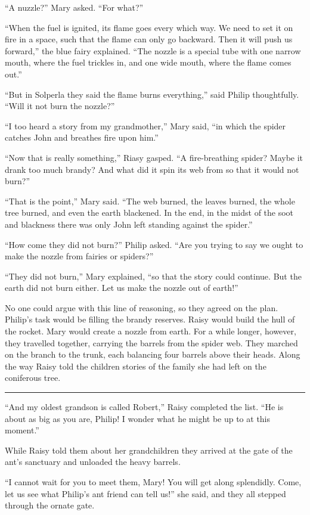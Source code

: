 \documentclass[10pt, draft]{memoir}
\renewcommand{\pfbreakdisplay}{\bigskip \ding{166} \bigskip}
\newcommand{\secbreak}{\fancybreak{\pfbreakdisplay}}
\begin{document}
``A nuzzle?'' Mary asked. ``For what?''

``When the fuel is ignited, its flame goes every which way. We need to set it
on fire in a space, such that the flame can only go backward. Then it will push
us forward,'' the blue fairy explained. ``The nozzle is a special tube with one
narrow mouth, where the fuel trickles in, and one wide mouth, where the flame
comes out.''

``But in Solperla they said the flame burns everything,'' said Philip
thoughtfully. ``Will it not burn the nozzle?''

``I too heard a story from my grandmother,'' Mary said, ``in which the spider
catches John and breathes fire upon him.''

``Now that is really something,'' Riasy gasped. ``A fire-breathing spider?
Maybe it drank too much brandy? And what did it spin its web from so that it
would not burn?''

``That is the point,'' Mary said. ``The web burned, the leaves burned, the
whole tree burned, and even the earth blackened. In the end, in the midst of
the soot and blackness there was only John left standing against the spider.''

``How come they did not burn?'' Philip asked. ``Are you trying to say we ought
to make the nozzle from fairies or spiders?''

``They did not burn,'' Mary explained, ``so that the story could continue. But
the earth did not burn either. Let us make the nozzle out of earth!''

No one could argue with this line of reasoning, so they agreed on the plan.
Philip's task would be filling the brandy reserves. Raisy would build the hull
of the rocket. Mary would create a nozzle from earth. For a while longer,
however, they travelled together, carrying the barrels from the spider web.
They marched on the branch to the trunk, each balancing four barrels above
their heads. Along the way Raisy told the children stories of the family she
had left on the coniferous tree.

\secbreak

``And my oldest grandson is called Robert,'' Raisy completed the list. ``He is
about as big as you are, Philip! I wonder what he might be up to at this
moment.''

While Raisy told them about her grandchildren they arrived at the gate of the
ant's sanctuary and unloaded the heavy barrels.

``I cannot wait for you to meet them, Mary! You will get along splendidly.
Come, let us see what Philip's ant friend can tell us!'' she said, and they all
stepped through the ornate gate.
\end{document}
